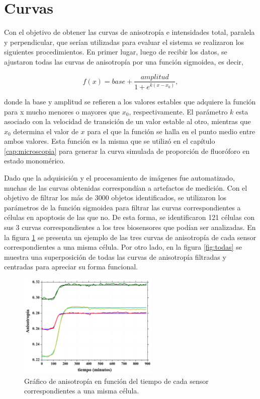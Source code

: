 \section{Curvas}

Con el objetivo de obtener las curvas de anisotropía e intensidades total, paralela y perpendicular, que serían utilizadas para evaluar el sistema se realizaron los siguientes procedimientos. En primer lugar, luego de recibir los datos, se ajustaron todas las curvas de anisotropía por una función sigmoidea, es decir,

\begin{equation}
    f(x) = base + \frac{amplitud}{1+e^{k(x-x_0)}},
\end{equation}

\noindent donde la base y amplitud se refieren a los valores estables que adquiere la función para x mucho menores o mayores que $x_0$, respectivamente. El parámetro $k$ esta asociado con la velocidad de transición de un valor estable al otro, mientras que $x_0$ determina el valor de $x$ para el que la función se halla en el punto medio entre ambos valores. Esta función es la misma que se utilizó en el capítulo \ref{cap:microscopia} para generar la curva simulada de proporción de fluoróforo en estado monomérico.

Dado que la adquisición y el procesamiento de imágenes fue automatizado, muchas de las curvas obtenidas correspondían a artefactos de medición. Con el objetivo de filtrar los más de 3000 objetos identificados, se utilizaron los parámetros de la función sigmoidea para filtrar las curvas correspondientes a células en apoptosis de las que no. De esta forma, se identificaron 121 células con sus 3 curvas correspondientes a los tres biosensores que podían ser analizadas. En la figura \ref{fig:Aniso_ej} se presenta un ejemplo de las tres curvas de anisotropía de cada sensor correspondientes a una misma célula. Por otro lado, en la figura \ref{fig:todas} se muestra una superposición de todas las curvas de anisotropía filtradas y centradas para apreciar su forma funcional.

\begin{figure}
    \centering
    \includegraphics[width=0.6\textwidth]{./img/Cap4/Anisotropia2145.png}
    \caption{Gráfico de anisotropía en función del tiempo de cada sensor correspondientes a una misma célula.}
    \label{fig:Aniso_ej}
\end{figure}

